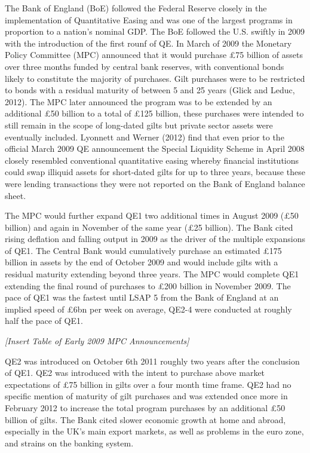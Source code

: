 The Bank of England (BoE) followed the Federal Reserve closely in the implementation of Quantitative Easing and was one of the largest programs in proportion to a nation's nominal GDP. The BoE followed the U.S. swiftly in 2009 with the introduction of the first rounf of QE. In March of 2009 the Monetary Policy Committee (MPC) announced that it would purchase £75 billion of assets over three months funded by central bank reserves, with conventional bonds likely to constitute the majority of purchases. Gilt purchases were to be restricted to bonds with a residual maturity of between 5 and 25 years (Glick and Leduc, 2012).  The MPC later announced the program was to be extended by an additional £50 billion to a total of £125 billion, these purchases were intended to still remain in the scope of long-dated gilts but private sector assets were eventually included. Lyonnett and Werner (2012) find that even prior to the official March 2009 QE announcement the Special Liquidity Scheme in April 2008 closely resembled conventional quantitative easing whereby financial institutions could swap illiquid assets for short-dated gilts for up to three years, because these were lending transactions they were not reported on the Bank of England balance sheet. 

The MPC would further expand QE1 two additional times in August 2009 (£50 billion) and again in November of the same year (£25 billion). The Bank cited rising deflation and falling output in 2009 as the driver of the multiple expansions of QE1. The Central Bank would cumulatively purchase an estimated £175 billion in assets by the end of October 2009 and would include gilts with a residual maturity extending beyond three years. The MPC would complete QE1 extending the final round of purchases to £200 billion in November 2009. The pace of QE1 was the fastest until LSAP 5 from the Bank of England at an implied speed of £6bn per week on average, QE2-4 were conducted at roughly half the pace of QE1.

\textit{[Insert Table of Early 2009 MPC Announcements]}

QE2 was introduced on October 6th 2011 roughly two years after the conclusion of QE1. QE2 was introduced with the intent to purchase above market expectations of £75 billion in gilts over a four month time frame. QE2 had no specific mention of maturity of gilt purchases and was extended once more in February 2012 to increase the total program purchases by an additional £50 billion of gilts. The Bank cited slower economic growth at home and abroad, especially in the UK's main export markets, as well as problems in the euro zone, and strains on the banking system. 

